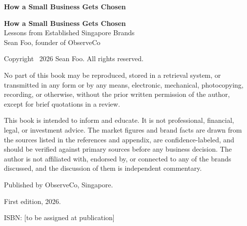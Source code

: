 \documentclass[10pt,twoside,openany]{memoir}
\begin{document}
\sloppy  %

\thispagestyle{empty}
\begin{center}
\vspace*{0.4\textheight}
{\Huge\bfseries\color{accent} How a Small Business Gets Chosen }
\end{center}
\cleardoublepage

\thispagestyle{empty}
\begin{center}
\vspace*{0.3\textheight}
{\Huge\bfseries\color{accent} How a Small Business Gets Chosen }\\[1em]
{\Large Lessons from Established Singapore Brands }\\[3em]
{\large Sean Foo, founder of ObserveCo }
\end{center}
\cleardoublepage

\clearpage
\thispagestyle{empty}          %
\vspace*{0pt}                  %
{\footnotesize                 %
  \noindent Copyright \textcopyright\ 2026 Sean Foo. All rights reserved.\par
  \medskip
  \noindent No part of this book may be reproduced, stored in a retrieval system, or transmitted in any form or by any means, electronic, mechanical, photocopying, recording, or otherwise, without the prior written permission of the author, except for brief quotations in a review.\par
  \medskip
  \noindent This book is intended to inform and educate. It is not professional, financial, legal, or investment advice. The market figures and brand facts are drawn from the sources listed in the references and appendix, are confidence-labeled, and should be verified against primary sources before any business decision. The author is not affiliated with, endorsed by, or connected to any of the brands discussed, and the discussion of them is independent commentary.\par
  \medskip
  \noindent Published by ObserveCo, Singapore.\par
  \medskip
  \noindent First edition, 2026.\par
  \medskip
  \noindent ISBN: [to be assigned at publication]\par
}
\clearpage
\end{document}
